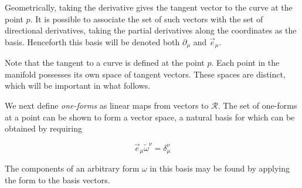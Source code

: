 Geometrically, taking the derivative gives the tangent vector to the
curve at the point $p$.  It is possible to associate the set of such
vectors with the set of directional derivatives, taking the partial
derivatives along the coordinates as the basis.  Henceforth this basis
will be denoted both $\partial_\mu$ and $\vec{e}_\mu$.

Note that the tangent to a curve is defined at the point $p$.  Each
point in the manifold possesses its own space of tangent vectors.
These spaces are distinct, which will be important in what follows.

We next define \emph{one-forms} as linear maps from vectors to
$\mathcal{R}$.  The set of one-forms at a point can be shown to form a
vector space, a natural basis for which can be obtained by requiring

\begin{equation*}
\vec{e}_\mu \tilde{\omega}^\nu = \delta_\mu^\nu
\end{equation*}

The components of an arbitrary form $\omega$ in this basis may be
found by applying the form to the basis vectors.

